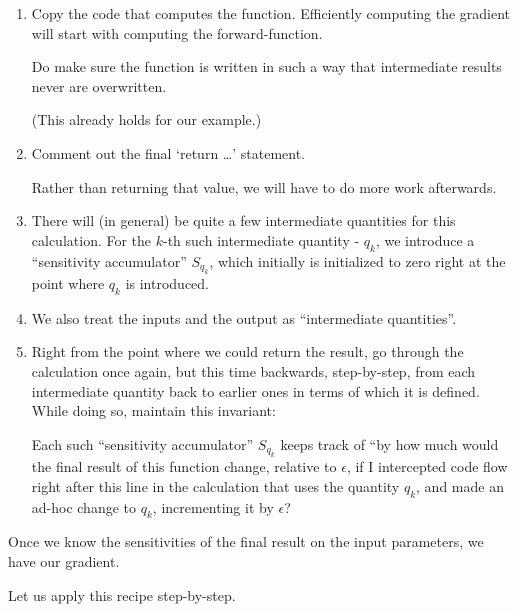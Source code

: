 \documentclass[11pt]{article}
\begin{document}
\begin{enumerate}
\def\labelenumi{\arabic{enumi}.}
\item
  Copy the code that computes the function. Efficiently computing the
  gradient will start with computing the forward-function.

  Do make sure the function is written in such a way that intermediate
  results never are overwritten.

  (This already holds for our example.)
\item
  Comment out the final `return \ldots{}' statement.

  Rather than returning that value, we will have to do more work
  afterwards.
\item
  There will (in general) be quite a few intermediate quantities for
  this calculation. For the \(k\)-th such intermediate quantity -
  \(q_k\), we introduce a ``sensitivity accumulator'' \(S_{q_k}\), which
  initially is initialized to zero right at the point where \(q_k\) is
  introduced.
\item
  We also treat the inputs and the output as ``intermediate
  quantities''.
\item
  Right from the point where we could return the result, go through the
  calculation once again, but this time backwards, step-by-step, from
  each intermediate quantity back to earlier ones in terms of which it
  is defined. While doing so, maintain this invariant:

  Each such ``sensitivity accumulator'' \(S_{q_k}\) keeps track of ``by
  how much would the final result of this function change, relative to
  \(\epsilon\), if I intercepted code flow right after this line in the
  calculation that uses the quantity \(q_k\), and made an ad-hoc change
  to \(q_k\), incrementing it by \(\epsilon\)?
\end{enumerate}

Once we know the sensitivities of the final result on the input
parameters, we have our gradient.

Let us apply this recipe step-by-step.
\end{document}
